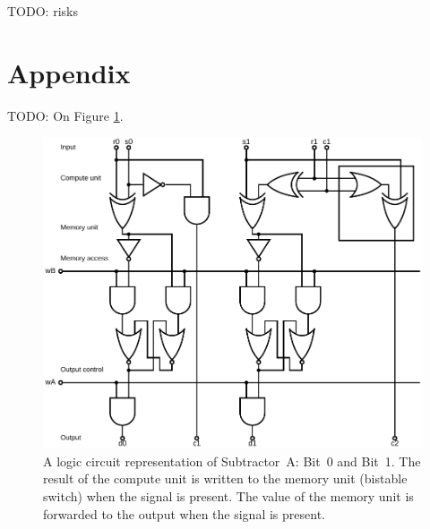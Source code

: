 \documentclass[12pt,notitlepage]{article}
\newcommand{\TODO}[1]{\textrm{\color{red}TODO: #1}}
\begin{document}
\TODO{risks}


\footnotesize




\section*{Appendix}

\TODO{On Figure \ref{f:logical-subtractor01}.}

\begin{figure}[phbt]
\centering
\includegraphics[width=0.9\linewidth]{circuits/Logical-HalfSubtractor0.svg.pdf}
\caption{%
A logic circuit representation of Subtractor~A:
Bit~0 and Bit~1.
%
The result of the compute unit is written to the memory unit
(bistable switch)
when the signal  is present.
%
The value of the memory unit is
forwarded to the output
when the signal  is present.
}
\label{f:logical-subtractor01}
\end{figure}




\clearpage

\SHOWTODOS




\leavevmode\vfill{\tiny\color{lightgray}\hfill{\DTMnow}}
\end{document}
